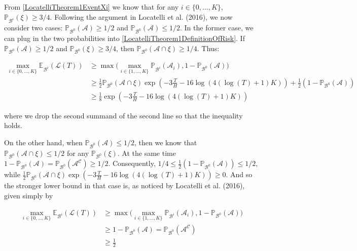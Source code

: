 \documentclass[12pt,]{article}
\begin{document}
From \eqref{LocatelliTheorem1EventXi} we know that for any
\(i \in \{0, \dots, K\}\), \(\mathbb{P}_{\mathcal{B}^i}(\xi) \geq 3/4\).
Following the argument in Locatelli et al. (2016), we now consider two
cases: \(\mathbb{P}_{\mathcal{B}^0}(\mathcal{A}) \geq 1/2\) and
\(\mathbb{P}_{\mathcal{B}^0}(\mathcal{A}) \leq 1/2\). In the former
case, we can plug in the two probabilities into
\eqref{LocatelliTheorem1DefinitionOfRisk}. If
\(\mathbb{P}_{\mathcal{B}^0}(\mathcal{A}) \geq 1/2\) and
\(\mathbb{P}_{\mathcal{B}^0}(\xi) \geq 3/4\), then
\(\mathbb{P}_{\mathcal{B}^0}(\mathcal{A} \cap \xi) \geq 1/4\). Thus:

\begin{align*}
\max_{i \in \{0, \dots, K\}} \mathbb{E}_{\mathcal{B}^i} (\mathcal{L}(T)) & \geq \max \big( \max_{i \in \{1, \dots, K\}} \mathbb{P}_{\mathcal{B}^i}(\mathcal{A}_i), 1 - \mathbb{P}_{\mathcal{B}^0}(\mathcal{A}) \big) \\
& \geq \frac{1}{2}\mathbb{P}_{\mathcal{B}^0} (\mathcal{A} \cap \xi) \exp (- 3 \frac{T}{H} -16 \log(4(\log(T)+1)K)) + \frac{1}{2}(1 - \mathbb{P}_{\mathcal{B}^0}(\mathcal{A})) \\
& \geq \frac{1}{8} \exp (- 3 \frac{T}{H} -16 \log(4(\log(T)+1)K))
\end{align*}

where we drop the second summand of the second line so that the
inequality holds.

On the other hand, when
\(\mathbb{P}_{\mathcal{B}^0}(\mathcal{A}) \leq 1/2\), then we know that
\(\mathbb{P}_{\mathcal{B}^0}(\mathcal{A} \cap \xi) \leq 1/2\) for any
\(\mathbb{P}_{\mathcal{B}^0}(\xi)\). At the same time
\(1-\mathbb{P}_{\mathcal{B}^0}(\mathcal{A}) = \mathbb{P}_{\mathcal{B}^0}(\mathcal{A^C}) \geq 1/2\).
Consequently,
\(1/4 \leq \frac{1}{2}(1 - \mathbb{P}_{\mathcal{B}^0}(\mathcal{A})) \leq 1/2\),
while
\(\frac{1}{2}\mathbb{P}_{\mathcal{B}^0} (\mathcal{A} \cap \xi) \exp (- 3 \frac{T}{H} -16 \log(4(\log(T)+1)K)) \geq 0\).
And so the stronger lower bound in that case is, as noticed by Locatelli
et al. (2016), given simply by

\begin{align*}
\max_{i \in \{0, \dots, K\}} \mathbb{E}_{\mathcal{B}^i} (\mathcal{L}(T)) & \geq \max \big( \max_{i \in \{1, \dots, K\}} \mathbb{P}_{\mathcal{B}^i}(\mathcal{A}_i), 1 - \mathbb{P}_{\mathcal{B}^0}(\mathcal{A}) \big) \\
& \geq 1 - \mathbb{P}_{\mathcal{B}^0}(\mathcal{A}) = \mathbb{P}_{\mathcal{B}^0}(\mathcal{A^C}) \\
& \geq \frac{1}{2}
\end{align*}
\end{document}
